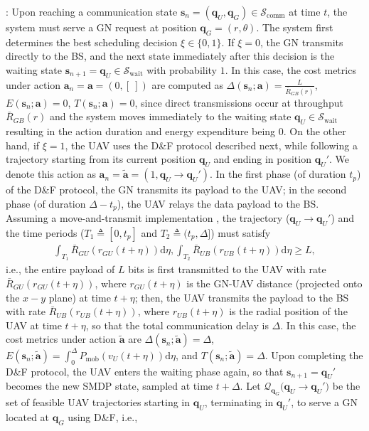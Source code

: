 \documentclass[10pt,twocolumn]{IEEEtran}
\begin{document}
:
Upon reaching a communication state $\mathbf{s}_{n}{=}(\mathbf{q}_{U},\mathbf{q}_{G}){\in}\mathcal{S}_{\mathrm{comm}}$ at time $t$, the system must serve a GN request at position $\mathbf{q}_{G}{=}(r,\theta)$. The system first determines the best scheduling decision $\xi{\in}\{0,1\}$. If $\xi{=}0$, the GN transmits directly to the BS, and the next state immediately after this decision is the waiting state $\mathbf{s}_{n{+}1}{=}\mathbf{q}_{U}{\in}\mathcal{S}_{\mathrm{wait}}$ with probability $1$. In this case, the cost metrics under action $\mathbf{a}_{n}{=}\mathbf{a}{=}(0,[\ ])$ are computed as $\Delta(\mathbf{s}_{n};\mathbf{a}){=}\frac{L}{\bar R_{GB}(r)}$, $E(\mathbf{s}_{n};\mathbf{a}){=}0$, $T(\mathbf{s}_{n};\mathbf{a}){=}0$, since direct transmissions occur at throughput $\bar{R}_{GB}(r)$ and the system moves immediately to the waiting state $\mathbf{q}_{U}{\in}\mathcal{S}_{\mathrm{wait}}$ resulting in the action duration and energy expenditure being $0$. On the other hand, if $\xi{=}1$, the UAV uses the D\&F protocol described next, while following a trajectory starting from its current position $\mathbf{q}_{U}$ and ending in position $\mathbf{q}_{U}'$. We denote this action as $\mathbf{a}_{n}{=}\mathbf{\tilde{a}}{=}(1,\mathbf{q}_{U}{\rightarrow}{\mathbf{q}}_{U}')$. In the first phase (of duration $t_{p}$) of the D\&F protocol, the GN transmits its payload to the UAV; in the second phase (of duration $\Delta{-}t_{p}$), the UAV relays the data payload to the BS. Assuming a move-and-transmit implementation \cite{SCA}, the trajectory ($\mathbf{q}_{U}{\rightarrow}{\mathbf{q}}_{U}'$) and the time periods ($T_{1}{\triangleq}[0{,}t_{p}]$ and $T_{2}{\triangleq}(t_{p}{,}\Delta]$) must satisfy
\begin{align}
	\int_{T_{1}}\bar{R}_{GU}(r_{GU}(t{+}\eta))\mathrm{d}{\eta},\int_{T_{2}}\bar{R}_{UB}(r_{UB}(t{+}\eta))\mathrm{d}{\eta}{\geq}L\label{eq:PLConst1}\tag{C.1},
\end{align}
i.e., the entire payload of $L$ bits is first transmitted to the UAV with rate $\bar{R}_{GU}(r_{GU}(t{+}\eta))$, where $r_{GU}(t{+}{\eta})$ is the GN-UAV distance (projected onto the $x{-}y$ plane) at time $t{+}\eta$; then, the UAV transmits the payload to the BS with rate $\bar{R}_{UB}(r_{UB}(t{+}\eta))$, where $r_{UB}(t{+}\eta)$ is the radial position of the UAV at time $t{+}\eta$, so that the total communication delay is $\Delta$.  In this case, the cost metrics under action $\mathbf{\tilde{a}}$ are $\Delta(\mathbf{s}_{n};\mathbf{\tilde{a}}){=}\Delta$, $E(\mathbf{s}_{n};\mathbf{\tilde{a}}){=}\int_0^\Delta P_{\mathrm{mob}}\left(v_{U}(t{+}\eta)\right)\mathrm{d}\eta$, and $T(\mathbf{s}_{n};\mathbf{\tilde{a}}){=}\Delta$. Upon completing the D\&F protocol, the UAV enters the waiting phase again, so that $\mathbf{s}_{n{+}1}{=}\mathbf{q}_{U}'$ becomes the new SMDP state, sampled at time $t{+}\Delta$. Let $\mathcal{Q}_{\mathbf{q}_{G}}\big(\mathbf{q}_{U}{\rightarrow}{\mathbf{q}}_{U}'\big)$ be the set of feasible UAV trajectories starting in $\mathbf{q}_{U}$, terminating in $\mathbf{q}_{U}'$, to serve a GN located at $\mathbf{q}_{G}$ using D\&F, i.e., 
\end{document}
